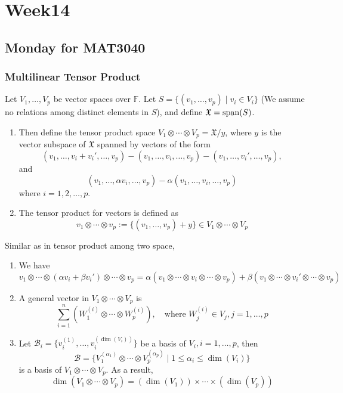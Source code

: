 \chapter{Week14}
\section{Monday for MAT3040}
\subsection{Multilinear Tensor Product}

\begin{definition}
Let $V_1,\dots,V_p$ be vector spaces over $\mathbb{F}$.
Let $S=\{(v_1,\dots,v_p)\mid v_i\in V_i\}$
(We assume no relations among distinct elements in $S$), 
and define $\mathfrak{X}=\operatorname{span}(S)$.
\begin{enumerate}
\item
Then define the tensor product space $V_1\otimes\cdots\otimes V_p=\mathfrak{X}/y$,
where $y$ is the vector subspace of $\mathfrak{X}$ spanned by vectors of the form 
\[
(v_1,\dots,v_i+v_i',\dots,v_p)
-
(v_1,\dots,v_i,\dots,v_p)
-
(v_1,\dots,v_i',\dots,v_p),
\]
and
\[
(v_1,\dots,\alpha v_i,\dots,v_p) - \alpha(v_1,\dots,v_i,\dots,v_p)
\]
where $i=1,2,\dots,p$.
\item
The tensor product for vectors is defined as
\[
v_1\otimes\cdots\otimes v_p:=\{(v_1,\dots,v_p)+y\}\in 
V_1\otimes\cdots\otimes V_p
\]
\end{enumerate}
\end{definition}
\begin{remark}
Similar as in tensor product among two space, 
\begin{enumerate}
\item
We have 
\[
v_1\otimes\cdots\otimes (\alpha v_i+\beta v_i')\otimes\cdots\otimes v_p
=
\alpha (v_1\otimes\cdots\otimes v_i\otimes\cdots\otimes v_p)
+
\beta (v_1\otimes\cdots\otimes v_i'\otimes\cdots\otimes v_p)
\]
\item
A general vector in $V_1\otimes\cdots\otimes V_p$ is 
\[
\sum_{i=1}^n
(W_1^{(i)}\otimes\cdots\otimes W_p^{(i)}),\quad
\text{where }
W_j^{(i)}\in V_j, j=1,\dots,p
\]
\item
Let $\mathcal{B}_i= \{v_i^{(1)},\dots,v_i^{(\dim(V_i))}\}$
be a basis of $V_i, i=1,\dots,p$,
then 
\[
\mathcal{B}
=
\{
V_1^{(\alpha_1)}
\otimes
\cdots
\otimes
V_p^{(\alpha_p)}
\mid 
1\le \alpha_i\le \dim(V_i)
\}
\]
is a basis of $V_1\otimes\cdots\otimes V_p$.
As a result,
\[
\dim(V_1\otimes\cdots\otimes V_p)
=
(\dim(V_1))\times\cdots\times
(\dim(V_p))
\]
\end{enumerate}

\end{remark}

